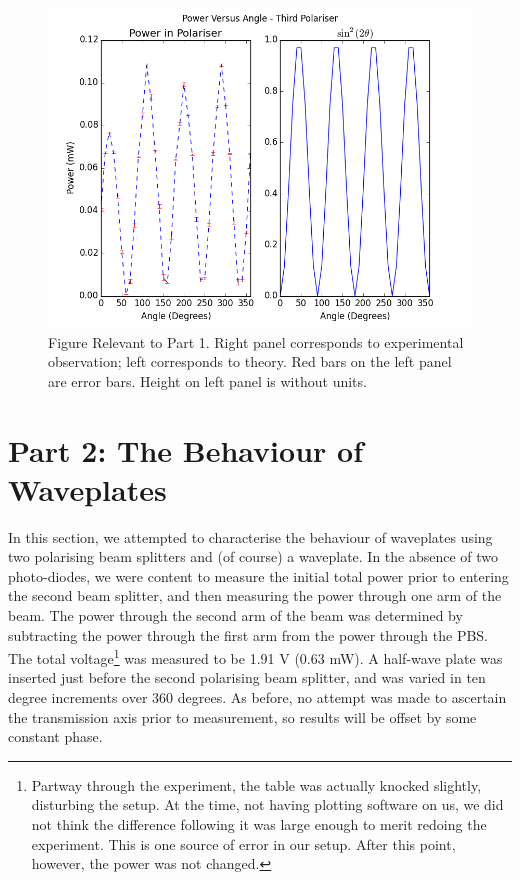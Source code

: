 \documentclass[10pt,a4paper]{article}
\begin{document}
\begin{figure}[h]
\centering
\includegraphics[scale = 0.6]{../Analysis/figure_1.png}
\caption{Figure Relevant to Part 1. Right panel corresponds to experimental observation; left corresponds to theory. Red bars on the left panel are error bars. Height on left panel is without units.} 
\end{figure}
\section*{Part 2: The Behaviour of Waveplates}
In this section, we attempted to characterise the behaviour of waveplates using two polarising beam splitters and (of course) a waveplate. In the absence of two photo-diodes, we were content to measure the initial total power prior to entering the second beam splitter, and then measuring the power through one arm of the beam. The power through the second arm of the beam was determined by subtracting the power through the first arm from the power through the PBS. The total voltage\footnote{Partway through the experiment, the table was actually knocked slightly, disturbing the setup. At the time, not having plotting software on us, we did not think the difference following it was large enough to merit redoing the  experiment. This is one source of error in our setup. After this point, however, the power was not changed.} was measured to be 1.91 V (0.63 mW). A half-wave plate was inserted just before the second polarising beam splitter, and was varied in ten degree increments over 360 degrees. As before, no attempt was made to ascertain the transmission axis prior to measurement, so results will be offset by some constant phase.
\end{document}
